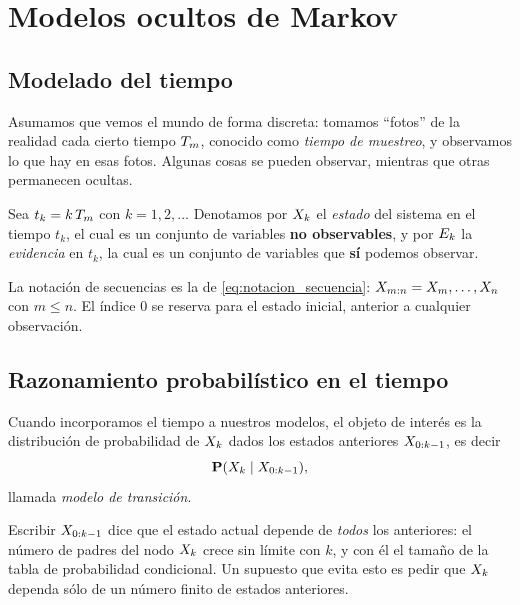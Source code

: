 \section{Modelos ocultos de Markov}
\label{sec:modelos_ocultos_markov}

\subsection{Modelado del tiempo}
\label{subsec:modelado_tiempo}

Asumamos que vemos el mundo de forma discreta: tomamos ``fotos'' de la
realidad cada cierto tiempo $T_m$, conocido como \emph{tiempo de muestreo}, y
observamos lo que hay en esas fotos. Algunas cosas se pueden observar,
mientras que otras permanecen ocultas.

\begin{definicion}
  \label{def:estado_evidencia}
  Sea $t_k=k\,T_m$ con $k=1,2,\dots$ Denotamos por $X_{k}$ el
  \emph{estado} del sistema en el tiempo $t_k$, el cual es un conjunto de
  variables \textbf{no observables}, y por $E_{k}$ la \emph{evidencia} en
  $t_k$, la cual es un conjunto de variables que \textbf{s\'i} podemos
  observar.
\end{definicion}

La notaci\'on de secuencias es la de \eqref{eq:notacion_secuencia}:
$X_{m:n}=X_{m},\dots,X_{n}$ con $m\le n$. El \'indice $0$ se reserva para
el estado inicial, anterior a cualquier observaci\'on.

\subsection{Razonamiento probabil\'istico en el tiempo}
\label{subsec:razonamiento_temporal}

Cuando incorporamos el tiempo a nuestros modelos, el objeto de inter\'es es
la distribuci\'on de probabilidad de $X_{k}$ dados los estados anteriores
$X_{0:k-1}$, es decir
\begin{equation}
  \label{eq:modelo_transicion_general}
  \mathbf{P}(X_{k}\mid X_{0:k-1}),
\end{equation}
llamada \emph{modelo de transici\'on}.

Escribir $X_{0:k-1}$ dice que el estado actual depende de \emph{todos} los
anteriores: el n\'umero de padres del nodo $X_{k}$ crece sin l\'imite con
$k$, y con \'el el tama\~no de la tabla de probabilidad condicional. Un
supuesto que evita esto es pedir que $X_{k}$ dependa s\'olo de un n\'umero
finito de estados anteriores.

